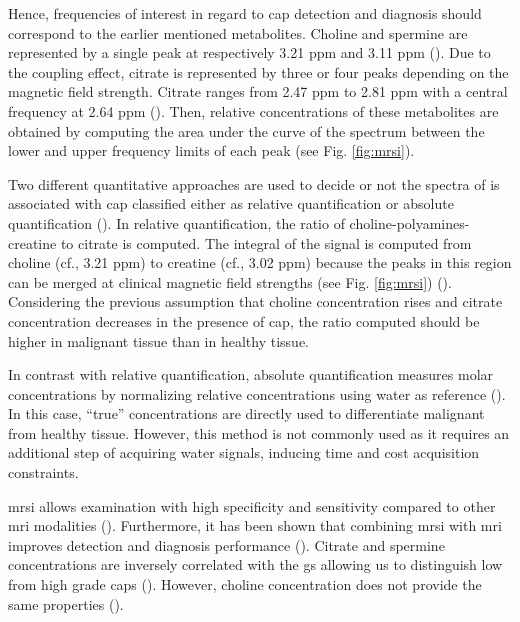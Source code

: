 \begin{enumerate}[leftmargin=*]
Hence, frequencies of interest in regard to \ac{cap} detection and diagnosis should correspond to the earlier mentioned metabolites. Choline and spermine are represented by a single peak at respectively 3.21 ppm and 3.11 ppm (\cite{Verma2010}). Due to the coupling effect, citrate is represented by three or four peaks depending on the magnetic field strength. Citrate ranges from 2.47 ppm to 2.81 ppm with a central frequency at 2.64 ppm (\cite{Verma2010}). Then, relative concentrations of these metabolites are obtained by computing the area under the curve of the spectrum between the lower and upper frequency limits of each peak (see Fig. \ref{fig:mrsi}).

Two different quantitative approaches are used to decide or not the spectra of  is associated with \ac{cap} classified either as relative quantification or absolute quantification (\cite{Lemaitre2011}). In relative quantification, the ratio of choline-polyamines-creatine to citrate is computed. The integral of the signal is computed from choline (cf., 3.21 ppm) to creatine (cf., 3.02 ppm) because the peaks in this region can be merged at clinical magnetic field strengths (see Fig. \ref{fig:mrsi}) (\cite{Hoeks2011,Graaf2000}). Considering the previous assumption that choline concentration rises and citrate concentration decreases in the presence of \ac{cap}, the ratio computed should be higher in malignant tissue than in healthy tissue. 

In contrast with relative quantification, absolute quantification measures molar concentrations by normalizing relative concentrations using water as reference (\cite{Lemaitre2011}). In this case, ``true'' concentrations are directly used to differentiate malignant from healthy tissue. However, this method is not commonly used as it requires an additional step of acquiring water signals, inducing time and cost acquisition constraints.

\ac{mrsi} allows examination with high specificity and sensitivity compared to other \ac{mri} modalities (\cite{Choi2007}). Furthermore, it has been shown that combining \ac{mrsi} with \ac{mri} improves detection and diagnosis performance (\cite{Scheidler1999a,Kaji1998,Vilanova2009}). Citrate and spermine concentrations are inversely correlated with the \ac{gs} allowing us to distinguish low from high grade \acp{cap} (\cite{Giskeodegard2013}). However, choline concentration does not provide the same properties (\cite{Giskeodegard2013}).


\end{enumerate}
